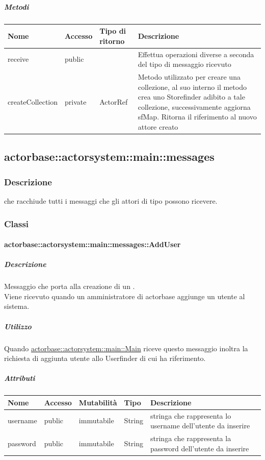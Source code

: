 \documentclass{scalatekids-article}
\begin{document}
\subparagraph{Metodi}

\begin{tabular}{| l | l | l | l |}
  \hline
  Nome & Accesso & Tipo di ritorno & Descrizione\\
  \hline
  receive & public &  & Effettua operazioni diverse a seconda del tipo di messaggio ricevuto\\
  \hline
  createCollection & private & ActorRef & Metodo utilizzato per creare una collezione, al suo interno il metodo crea uno Storefinder adibito a tale collezione, successivamente aggiorna sfMap. Ritorna il riferimento al nuovo attore creato\\
  \hline
\end{tabular}

\subsection{actorbase::actorsystem::main::messages}
\label{sec:actorbase::actorsystem::main::messages}

\subsubsection{Descrizione}
 che racchiude tutti i messaggi che gli attori di tipo
 possono ricevere.

\subsubsection{Classi}

\paragraph{actorbase::actorsystem::main::messages::AddUser}
\label{sec:actorbase::actorsystem::main::messages::AddUser}

\subparagraph{Descrizione}
Messaggio che porta alla creazione di un .\\Viene ricevuto
quando un amministratore di actorbase aggiunge un utente al sistema.

\subparagraph{Utilizzo}
Quando \hyperref[sec:actorbase::actorsystem::main::Main]{actorbase::actorsystem::main::Main}
riceve questo messaggio inoltra la richiesta di aggiunta utente allo
Userfinder di cui ha riferimento.

\subparagraph{Attributi}
\begin{tabular}{| p{3cm} | p{1.5cm} | p{2cm} | p{2cm} | p{8.5cm} |}
  \hline
  Nome & Accesso & Mutabilità & Tipo & Descrizione\\
  \hline
  username & public & immutabile & String & stringa che rappresenta lo username dell'utente da inserire \\
  \hline
  password & public & immutabile & String & stringa che rappresenta la password dell'utente da inserire \\
  \hline
\end{tabular}
\end{document}
